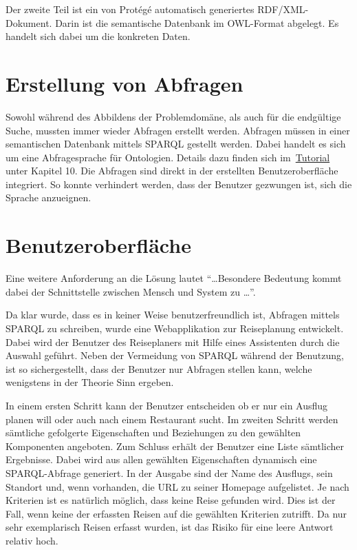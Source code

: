 Der zweite Teil ist ein von Protégé automatisch generiertes RDF/XML-Dokument. Darin ist die semantische Datenbank im OWL-Format abgelegt. Es handelt sich dabei um die konkreten Daten.

\section{Erstellung von Abfragen}
\label{sec:loesung_sparql}
Sowohl während des Abbildens der Problemdomäne, als auch für die endgültige Suche, mussten immer wieder Abfragen erstellt werden. Abfragen müssen in einer semantischen Datenbank mittels SPARQL gestellt werden. Dabei handelt es sich um eine Abfragesprache für Ontologien. Details dazu finden sich im~\hyperref[sec:anhang:tutorial_dokument]{Tutorial} unter Kapitel 10. Die Abfragen sind direkt in der erstellten Benutzeroberfläche integriert. So konnte verhindert werden, dass der Benutzer gezwungen ist, sich die Sprache anzueignen.

\section{Benutzeroberfläche}
\label{sec:loesung_gui}
Eine weitere Anforderung an die Lösung lautet ``\ldots Besondere Bedeutung kommt dabei der Schnittstelle zwischen Mensch und System zu \ldots''.~\cite{Aufgabenstellung}

Da klar wurde, dass es in keiner Weise benutzerfreundlich ist, Abfragen mittels SPARQL zu schreiben, wurde eine Webapplikation zur Reiseplanung entwickelt. Dabei wird der Benutzer des Reiseplaners mit Hilfe eines Assistenten durch die Auswahl geführt. Neben der Vermeidung von SPARQL während der Benutzung, ist so sichergestellt, dass der Benutzer nur Abfragen stellen kann, welche wenigstens in der Theorie Sinn ergeben.

In einem ersten Schritt kann der Benutzer entscheiden ob er nur ein Ausflug planen will oder auch nach einem Restaurant sucht. Im zweiten Schritt werden sämtliche gefolgerte Eigenschaften und Beziehungen zu den gewählten Komponenten angeboten. Zum Schluss erhält der Benutzer eine Liste sämtlicher Ergebnisse. Dabei wird aus allen gewählten Eigenschaften dynamisch eine SPARQL-Abfrage generiert. In der Ausgabe sind der Name des Ausflugs, sein Standort und, wenn vorhanden, die URL zu seiner Homepage aufgelistet. Je nach Kriterien ist es natürlich möglich, dass keine Reise gefunden wird. Dies ist der Fall, wenn keine der erfassten Reisen auf die gewählten Kriterien zutrifft. Da nur sehr exemplarisch Reisen erfasst wurden, ist das Risiko für eine leere Antwort relativ hoch.
